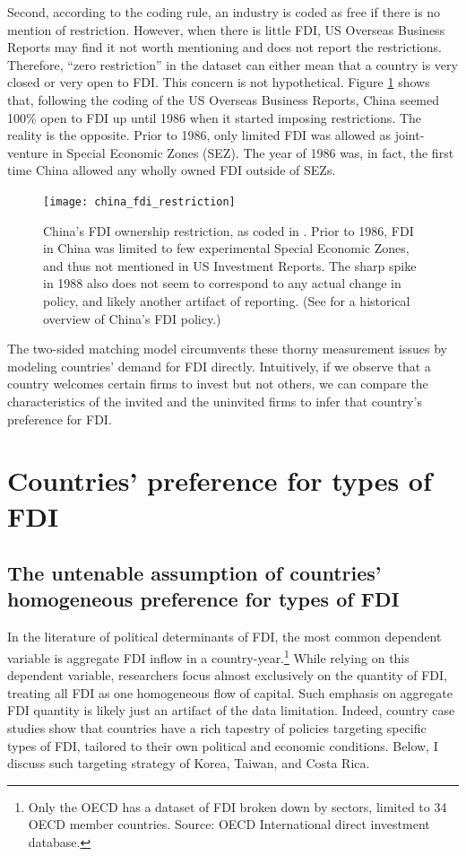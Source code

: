 Second, according to the coding rule, an industry is coded as free if there is
no mention of restriction. However, when there is little FDI, US Overseas
Business Reports may find it not worth mentioning and does not report the
restrictions. Therefore, ``zero restriction'' in the dataset can either mean
that a country is very closed or very open to FDI. This concern is not
hypothetical. Figure \ref{fig:china_fdi_restriction} shows that, following the
coding of the US Overseas Business Reports, China seemed 100\% open to FDI up
until 1986 when it started imposing restrictions. The reality is the opposite.
Prior to 1986, only limited FDI was allowed as joint-venture in Special Economic
Zones (SEZ). The year of 1986 was, in fact, the first time China allowed any
wholly owned FDI outside of SEZs.

\begin{figure}[tbp] \centering
  \texttt{[image: china\_fdi\_restriction]}
  \caption[China's FDI ownership restriction.]{China's FDI ownership
    restriction, as coded in \citet{Pandya2010}. Prior to 1986, FDI in China was
    limited to few experimental Special Economic Zones, and thus not mentioned
    in US Investment Reports. The sharp spike in 1988 also does not seem to
    correspond to any actual change in policy, and likely another artifact of
    reporting. (See \citet{Zebregs2002} for a historical overview of China's FDI
    policy.)}
  \label{fig:china_fdi_restriction}
\end{figure}

The two-sided matching model circumvents these thorny measurement issues by
modeling countries' demand for FDI directly. Intuitively, if we observe that a
country welcomes certain firms to invest but not others, we can compare the
characteristics of the invited and the uninvited firms to infer that country's
preference for FDI.

\section{Countries' preference for types of FDI}
\label{sec:demand_for_FDI_types}

\subsection{The untenable assumption of countries' homogeneous preference for
  types of FDI}

In the literature of political determinants of FDI, the most common dependent
variable is aggregate FDI inflow in a country-year.\footnote{Only the OECD has a
  dataset of FDI broken down by sectors, limited to 34 OECD member countries.
  Source: OECD International direct investment database.} While relying on this
dependent variable, researchers focus almost exclusively on the quantity
of FDI, treating all FDI as one homogeneous flow of capital. Such emphasis on
aggregate FDI quantity is likely just an artifact of the data limitation. Indeed,
country case studies show that countries have a rich tapestry of policies
targeting specific types of FDI, tailored to their own political and economic
conditions. Below, I discuss such targeting strategy of Korea, Taiwan, and Costa
Rica.

